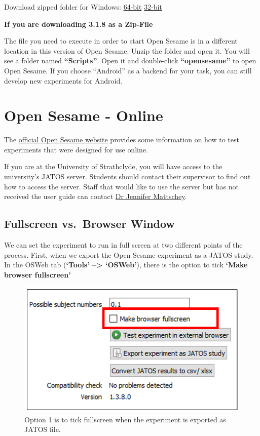 \documentclass[
]{book}
\begin{document}
Download zipped folder for Windows:
\href{https://github.com/smathot/OpenSesame/releases/download/release\%2F3.1.8/opensesame_3.1.8-py3.5-win64-1.zip}{64-bit}
\href{https://github.com/smathot/OpenSesame/releases/download/release\%2F3.1.8/opensesame_3.1.8-py2.7-win32-1.zip}{32-bit}

\textbf{If you are downloading 3.1.8 as a Zip-File}

The file you need to execute in order to start Open Sesame is in a different location in this version of Open Sesame. Unzip the folder and open it. You will see a folder named \textbf{``Scripts''}. Open it and double-click \textbf{``opensesame''} to open Open Sesame. If you choose ``Android'' as a backend for your task, you can still develop new experiments for Android.

\hypertarget{open-sesame---online}{%
\chapter{Open Sesame - Online}\label{open-sesame---online}}

The \href{https://osdoc.cogsci.nl/3.2/manual/osweb/}{official Open Sesame website} provides some information on how to test experiments that were designed for use online.

If you are at the University of Strathclyde, you will have access to the university's JATOS server. Students should contact their supervisor to find out how to access the server. Staff that would like to use the server but has not received the user guide can contact \href{jennifer.mattschey@strath.ac.uk}{Dr Jennifer Mattschey}.

\hypertarget{fullscreen-vs.-browser-window}{%
\section{Fullscreen vs.~Browser Window}\label{fullscreen-vs.-browser-window}}

We can set the experiment to run in full screen at two different points of the process. First, when we export the Open Sesame experiment as a JATOS study. In the OSWeb tab (\textbf{`Tools' --\textgreater{} `OSWeb'}), there is the option to tick \textbf{`Make browser fullscreen'}

\begin{figure}

{\centering \includegraphics[width=0.5\linewidth]{images/opensesame/fullscreen1} 

}

\caption{Option 1 is to tick fullscreen when the experiment is exported as JATOS file.}\label{fig:Figure13-1}
\end{figure}
\end{document}
